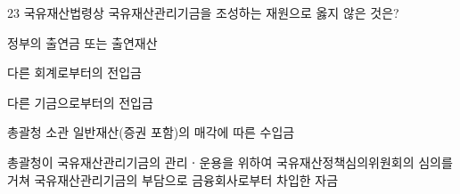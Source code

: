 \begin{question}{23}
국유재산법령상 국유재산관리기금을 조성하는 재원으로 옳지 않은 것은?
\begin{choices}
  \item 정부의 출연금 또는 출연재산
  \item 다른 회계로부터의 전입금
  \item 다른 기금으로부터의 전입금
  \item 총괄청 소관 일반재산(증권 포함)의 매각에 따른 수입금
  \item 총괄청이 국유재산관리기금의 관리ㆍ운용을 위하여 국유재산정책심의위원회의 심의를 거쳐 국유재산관리기금의 부담으로 금융회사로부터 차입한 자금
\end{choices}
\end{question}
